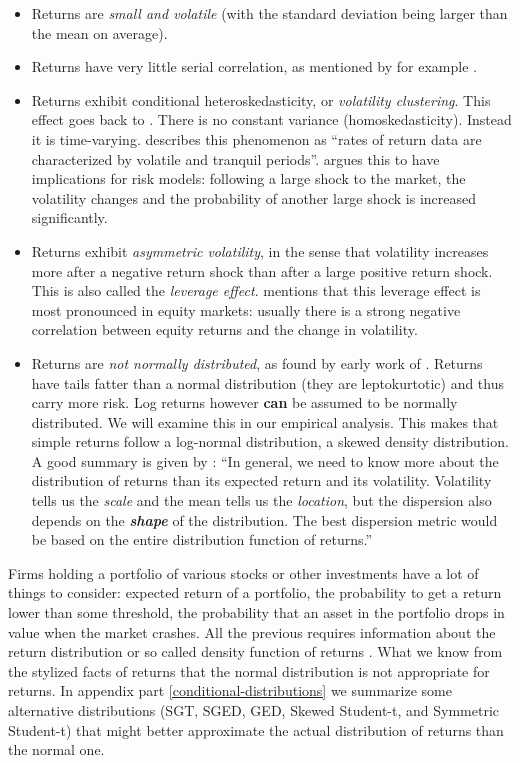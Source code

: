 \documentclass[a4paper, nobind]{templates/ociamthesis}
\providecommand{\tightlist}{%
  \setlength{\itemsep}{0pt}\setlength{\parskip}{0pt}}
\begin{document}
\begin{itemize}
\tightlist
\item
  Returns are \emph{small and volatile} (with the standard deviation being larger than the mean on average).
\item
  Returns have very little serial correlation, as mentioned by for example \textcite{bollerslev1987}.
\item
  Returns exhibit conditional heteroskedasticity, or \emph{volatility clustering}. This effect goes back to \textcite{mandelbrot1963}. There is no constant variance (homoskedasticity). Instead it is time-varying. \textcite{bollerslev1987} describes this phenomenon as ``rates of return data are characterized by volatile and tranquil periods''. \textcite{alexander2008} argues this to have implications for risk models: following a large shock to the market, the volatility changes and the probability of another large shock is increased significantly.
\item
  Returns exhibit \emph{asymmetric volatility}, in the sense that volatility increases more after a negative return shock than after a large positive return shock. This is also called the \emph{leverage effect}. \textcite{alexander2008} mentions that this leverage effect is most pronounced in equity markets: usually there is a strong negative correlation between equity returns and the change in volatility.
\item
  Returns are \emph{not normally distributed}, as found by early work of \textcite{fama1965}. Returns have tails fatter than a normal distribution (they are leptokurtotic) and thus carry more risk. Log returns however \textbf{can} be assumed to be normally distributed. We will examine this in our empirical analysis. This makes that simple returns follow a log-normal distribution, a skewed density distribution. A good summary is given by \textcite{alexander2008} : ``In general, we need to know more about the distribution of returns than its expected return and its volatility. Volatility tells us the \emph{scale} and the mean tells us the \emph{location}, but the dispersion also depends on the \textbf{\emph{shape}} of the distribution. The best dispersion metric would be based on the entire distribution function of returns.''
\end{itemize}

\noindent Firms holding a portfolio of various stocks or other investments have a lot of things to consider: expected return of a portfolio, the probability to get a return lower than some threshold, the probability that an asset in the portfolio drops in value when the market crashes. All the previous requires information about the return distribution or so called density function of returns . What we know from the stylized facts of returns that the normal distribution is not appropriate for returns. In appendix part \ref{conditional-distributions} we summarize some alternative distributions (SGT, SGED, GED, Skewed Student-t, and Symmetric Student-t) that might better approximate the actual distribution of returns than the normal one.
\end{document}

